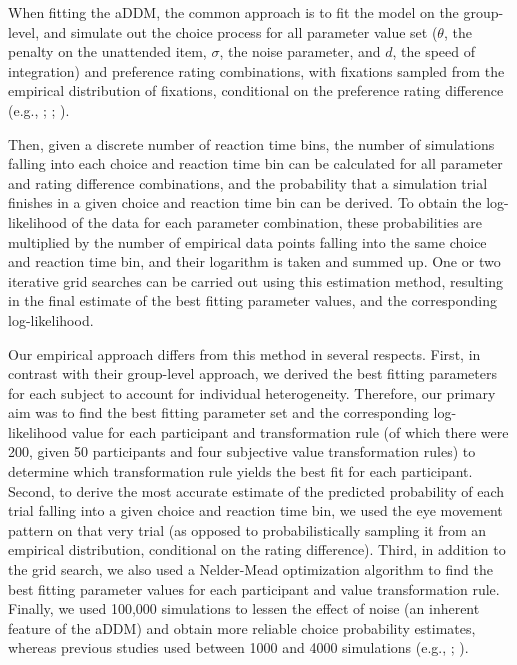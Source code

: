 \documentclass[11pt,a4paper]{article}
\begin{document}
When fitting the aDDM, the common approach is to fit the model on the group-level, and simulate out the choice process for all parameter value set ($\theta$, the penalty on the unattended item, $\sigma$, the noise parameter, and $d$, the speed of integration) and preference rating combinations, with fixations sampled from the empirical distribution of fixations, conditional on the preference rating difference  (e.g., ; ; ). 

Then, given a discrete number of reaction time bins, the number of simulations falling into each choice and reaction time bin can be calculated for all parameter and rating difference combinations, and the probability that a simulation trial finishes in a given choice and reaction time bin can be derived. To obtain the log-likelihood of the data for each parameter combination, these probabilities are multiplied by the number of empirical data points falling into the same choice and reaction time bin, and their logarithm is taken and summed up. One or two iterative grid searches can be carried out using this estimation method, resulting in the final estimate of the best fitting parameter values, and the corresponding log-likelihood.


Our empirical approach differs from this method in several respects. First, in contrast with their group-level approach, we derived the best fitting parameters for each subject to account for individual heterogeneity. Therefore, our primary aim was to find the best fitting parameter set and the corresponding log-likelihood value for each participant and transformation rule (of which there were 200, given 50 participants and four subjective value transformation rules) to determine which transformation rule yields the best fit for each participant. Second, to derive the most accurate estimate of the predicted probability of each trial falling into a given choice and reaction time bin, we used the eye movement pattern on that very trial (as opposed to probabilistically sampling it from an empirical distribution, conditional on the rating difference). Third, in addition to the grid search, we also used a Nelder-Mead optimization algorithm to find the best fitting parameter values for each participant and value transformation rule. Finally, we used 100,000 simulations to lessen the effect of noise (an inherent feature of the aDDM) and obtain more reliable choice probability estimates, whereas previous studies used between 1000 and 4000 simulations (e.g., ; ).  
\end{document}
